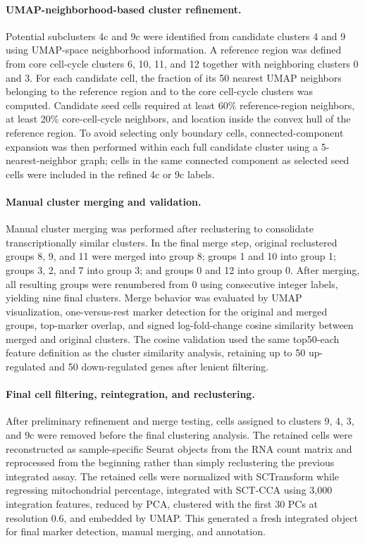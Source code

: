 \documentclass[11pt]{article}
\begin{document}
\paragraph{UMAP-neighborhood-based cluster refinement.}
Potential subclusters 4c and 9c were identified from candidate clusters 4 and 9 using UMAP-space neighborhood information. A reference region was defined from core cell-cycle clusters 6, 10, 11, and 12 together with neighboring clusters 0 and 3. For each candidate cell, the fraction of its 50 nearest UMAP neighbors belonging to the reference region and to the core cell-cycle clusters was computed. Candidate seed cells required at least 60\% reference-region neighbors, at least 20\% core-cell-cycle neighbors, and location inside the convex hull of the reference region. To avoid selecting only boundary cells, connected-component expansion was then performed within each full candidate cluster using a 5-nearest-neighbor graph; cells in the same connected component as selected seed cells were included in the refined 4c or 9c labels.

\paragraph{Manual cluster merging and validation.}
Manual cluster merging was performed after reclustering to consolidate transcriptionally similar clusters. In the final merge step, original reclustered groups 8, 9, and 11 were merged into group 8; groups 1 and 10 into group 1; groups 3, 2, and 7 into group 3; and groups 0 and 12 into group 0. After merging, all resulting groups were renumbered from 0 using consecutive integer labels, yielding nine final clusters. Merge behavior was evaluated by UMAP visualization, one-versus-rest marker detection for the original and merged groups, top-marker overlap, and signed log-fold-change cosine similarity between merged and original clusters. The cosine validation used the same top50-each feature definition as the cluster similarity analysis, retaining up to 50 up-regulated and 50 down-regulated genes after lenient filtering.

\paragraph{Final cell filtering, reintegration, and reclustering.}
After preliminary refinement and merge testing, cells assigned to clusters 9, 4, 3, and 9c were removed before the final clustering analysis. The retained cells were reconstructed as sample-specific Seurat objects from the RNA count matrix and reprocessed from the beginning rather than simply reclustering the previous integrated assay. The retained cells were normalized with SCTransform while regressing mitochondrial percentage, integrated with SCT-CCA using 3,000 integration features, reduced by PCA, clustered with the first 30 PCs at resolution 0.6, and embedded by UMAP. This generated a fresh integrated object for final marker detection, manual merging, and annotation.
\end{document}
